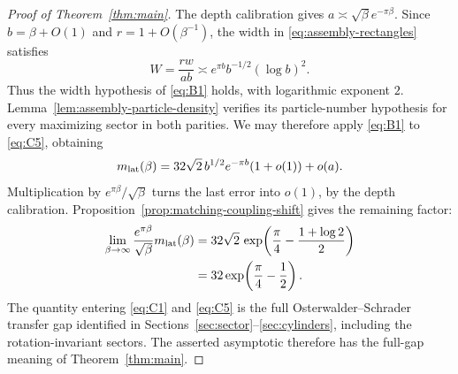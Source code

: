 \begin{proof}[Proof of Theorem~\ref{thm:main}]
The depth calibration gives
$a\asymp\sqrt\beta e^{-\pi\beta}$. Since $b=\beta+O(1)$ and
$r=1+O(\beta^{-1})$, the width in \eqref{eq:assembly-rectangles}
satisfies
\[
 W=\frac{rw}{ab}
   \asymp e^{\pi b}b^{-1/2}(\log b)^2.
\]
Thus the width hypothesis of \eqref{eq:B1} holds, with logarithmic
exponent $2$. Lemma~\ref{lem:assembly-particle-density} verifies its
particle-number hypothesis for every maximizing sector in both parities.
We may therefore apply \eqref{eq:B1} to \eqref{eq:C5}, obtaining
\[
 m_{\rm lat}(\beta)
    =32\sqrt2\,b^{1/2}e^{-\pi b}(1+o(1))+o(a).
\]
Multiplication by $e^{\pi\beta}/\sqrt\beta$ turns the last error into
$o(1)$, by the depth calibration. Proposition~\ref{prop:matching-coupling-shift}
gives the remaining factor:
\[
 \begin{split}
 \lim_{\beta\to\infty}
       \frac{e^{\pi\beta}}{\sqrt\beta}m_{\rm lat}(\beta)
  &=32\sqrt2\,
       \exp\!\left(\frac\pi4-\frac{1+\log2}{2}\right)\\
  &=32\exp\!\left(\frac\pi4-\frac12\right).
 \end{split}
\]
The quantity entering \eqref{eq:C1} and \eqref{eq:C5} is the full
Osterwalder--Schrader transfer gap identified in
Sections~\ref{sec:sector}--\ref{sec:cylinders}, including the
rotation-invariant sectors. The asserted asymptotic therefore has the
full-gap meaning of Theorem~\ref{thm:main}.
\end{proof}
